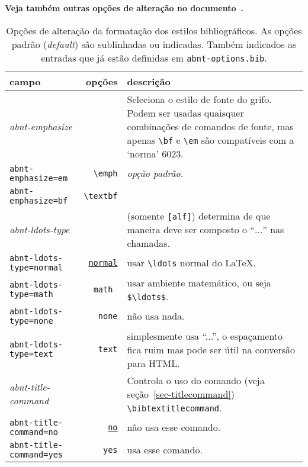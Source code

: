 \documentclass[a4paper]{ltxdoc}
\begin{document}
{\bf Veja também outras opções de alteração no documento~.}

\begin{table}[htbp]
\begin{center}
\begin{tabular}{lrp{8cm}}\hline\hline
campo & opções & descrição \\ \hline
\emph{abnt-emphasize} & & Seleciona o estilo de fonte do grifo.
Podem ser usadas quaisquer combinações de comandos de fonte, mas apenas
\verb+\bf+ e \verb+\em+ são compatíveis com a `norma' 6023. \\
{\tt abnt-emphasize=em} & \verb+\emph+ & {\em opção padrão}.  \\
{\tt abnt-emphasize=bf} & \verb+\textbf+ &
\\ \hline
\emph{abnt-ldots-type} && (somente {\tt [alf]}) determina de que maneira deve
ser composto o ``$\ldots$'' nas chamadas. \\
{\tt abnt-ldots-type=normal} & \underline{\tt normal} & usar \verb+\ldots+ normal do \LaTeX.\\
{\tt abnt-ldots-type=math} & \tt math & usar ambiente matemático, ou seja
\verb+$\ldots$+.\\
{\tt abnt-ldots-type=none} & {\tt none} & não usa nada.\\
{\tt abnt-ldots-type=text} & {\tt text} & simplesmente usa ``...'', o espaçamento
fica ruim mas pode ser útil na conversão para HTML.
\\ \hline
\emph{abnt-title-command} && Controla o uso do comando (veja
seção~\ref{sec-titlecommand}) \verb+\bibtextitlecommand+. \\
{\tt abnt-title-command=no} & \underline{\tt no} & não usa esse comando.\\
{\tt abnt-title-command=yes} & {\tt yes} & usa esse comando.
\\ \hline\hline
\end{tabular}
\end{center}
\caption[Opções de alteração dos estilos bibliográficos: formatação]{
Opções de alteração da formatação dos estilos bibliográficos.
As opções padrão (\emph{default}) são sublinhadas ou indicadas.
Também indicados as entradas que já estão definidas em {\tt abnt-options.bib}.}
\label{tabela-opcoes-formatacao}
\end{table}
\end{document}

